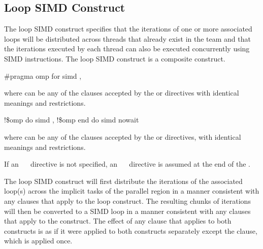 \begin{samepage}
\subsection{Loop SIMD Construct}
\label{subsec:Loop SIMD Construct}
\summary
The loop SIMD construct specifies that the iterations of one or more associated loops will be distributed across threads that already exist in the team and that the iterations executed by each thread can also be executed concurrently using SIMD instructions. The loop SIMD construct is a composite construct.
\end{samepage}

\pagebreak
\begin{samepage}
\syntax
\ccppspecificstart
\begin{boxedcode}
\#pragma omp for simd \plc{[clause[ [},\plc{] clause] ... ] new-line}
\end{boxedcode}
\end{samepage}

where  can be any of the clauses accepted by the  or  directives with 
identical meanings and restrictions.
\ccppspecificend

\fortranspecificstart
\begin{boxedcode}
!\$omp do simd \plc{[clause[ [},\plc{] clause] ... ]}
\plc{[}!\$omp end do simd \plc{[}nowait\plc{] ]}
\end{boxedcode}

where  can be any of the clauses accepted by the  or  directives, with 
identical meanings and restrictions.

If an ~~ directive is not specified, an ~~ directive is 
assumed at the end of the .
\fortranspecificend

\descr
The loop SIMD construct will first distribute the iterations of the associated loop(s) 
across the implicit tasks of the parallel region in a manner consistent with any clauses 
that apply to the loop construct. The resulting chunks of iterations will then be converted 
to a SIMD loop in a manner consistent with any clauses that apply to the  
construct. The effect of any clause that applies to both constructs is as if it were applied to both constructs separately except the  clause, which is applied once.

